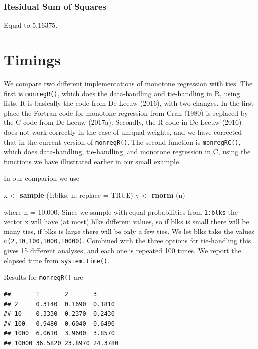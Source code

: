\documentclass[12pt,]{article}
\newenvironment{Shaded}{\begin{snugshade}}{\end{snugshade}}
\newcommand{\KeywordTok}[1]{\textcolor[rgb]{0.13,0.29,0.53}{\textbf{{#1}}}}
\newcommand{\DataTypeTok}[1]{\textcolor[rgb]{0.13,0.29,0.53}{{#1}}}
\newcommand{\DecValTok}[1]{\textcolor[rgb]{0.00,0.00,0.81}{{#1}}}
\newcommand{\StringTok}[1]{\textcolor[rgb]{0.31,0.60,0.02}{{#1}}}
\newcommand{\OtherTok}[1]{\textcolor[rgb]{0.56,0.35,0.01}{{#1}}}
\newcommand{\NormalTok}[1]{{#1}}
\begin{document}
\subsubsection{Residual Sum of Squares}\label{residual-sum-of-squares-2}

Equal to 5.16375.

\section{Timings}\label{timings}

We compare two different implementations of monotone regression with
ties. The first is \texttt{monregR()}, which does the data-handling and
tie-handling in R, using lists. It is basically the code from De Leeuw
(2016), with two changes. In the first place the Fortran code for
monotone regression from Cran (1980) is replaced by the C code from De
Leeuw (2017a). Secondly, the R code in De Leeuw (2016) does not work
correctly in the case of unequal weights, and we have corrected that in
the current version of \texttt{monregR()}. The second function is
\texttt{monregRC()}, which does data-handling, tie-handling, and
monotone regression in C, using the functions we have illustrated
earlier in our small example.

In our comparion we use

\begin{Shaded}
\begin{Highlighting}[]
\NormalTok{x <-}\StringTok{ }\KeywordTok{sample} \NormalTok{(}\DecValTok{1}\NormalTok{:blks, n, }\DataTypeTok{replace =} \OtherTok{TRUE}\NormalTok{)}
\NormalTok{y <-}\StringTok{ }\KeywordTok{rnorm} \NormalTok{(n)}
\end{Highlighting}
\end{Shaded}

where n = 10,000. Since we sample with equal probabilities from
\texttt{1:blks} the vector x will have (at most) blks different values,
so if blks is small there will be many ties, if blks is large there will
be only a few ties. We let blks take the values
\texttt{c(2,10,100,1000,10000)}. Combined with the three options for
tie-handling this gives 15 different analyses, and each one is repeated
100 times. We report the elapsed time from \texttt{system.time()}.

Results for \texttt{monregR()} are

\begin{verbatim}
##       1       2       3      
## 2     0.3140  0.1690  0.1810 
## 10    0.3330  0.2370  0.2430 
## 100   0.9480  0.6040  0.6490 
## 1000  6.0610  3.9600  3.8570 
## 10000 36.5820 23.8970 24.3780
\end{verbatim}
\end{document}
